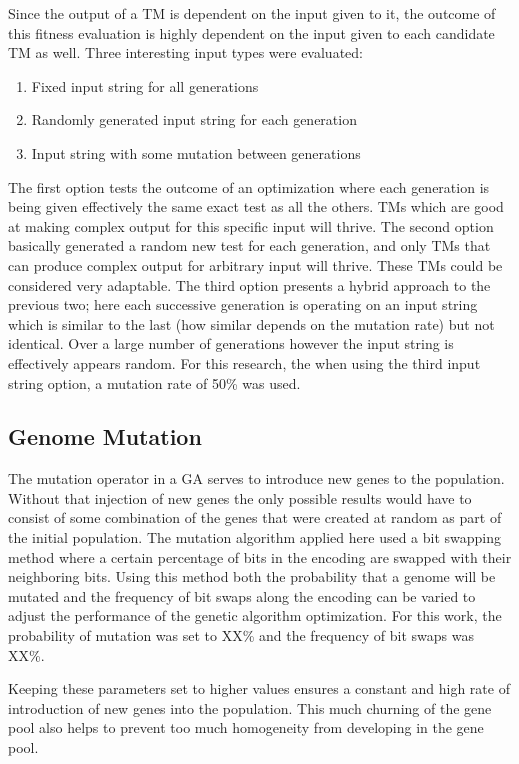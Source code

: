 Since the output of a TM is dependent on the input given to it, the outcome of this fitness evaluation is highly dependent on the input given to each candidate TM as well. Three interesting input types were evaluated: 

\begin{enumerate}
	\item Fixed input string for all generations
	\item Randomly generated input string for each generation
	\item Input string with some mutation between generations
\end{enumerate}

The first option tests the outcome of an optimization where each generation is being given effectively the same exact test as all the others. TMs which are good at making complex output for this specific input will thrive. The second option basically generated a random new test for each generation, and only TMs that can produce complex output for arbitrary input will thrive. These TMs could be considered very adaptable. The third option presents a hybrid approach to the previous two; here each successive generation is operating on an input string which is similar to the last (how similar depends on the mutation rate) but not identical. Over a large number of generations however the input string is effectively appears random. For this research, the when using the third input string option, a mutation rate of 50\% was used. 

\subsection{Genome Mutation}
The mutation operator in a GA serves to introduce new genes to the population. Without that injection of new genes the only possible results would have to consist of some combination of the genes that were created at random as part of the initial population. The mutation algorithm applied here used a bit swapping method where a certain percentage of bits in the encoding are swapped with their neighboring bits. Using this method both the probability that a genome will be mutated and the frequency of bit swaps along the encoding can be varied to adjust the performance of the genetic algorithm optimization. For this work, the probability of mutation was set to XX\% and the frequency of bit swaps was XX\%. 

Keeping these parameters set to higher values ensures a constant and high rate of introduction of new genes into the population. This much churning of the gene pool also helps to prevent too much homogeneity from developing in the gene pool. 

